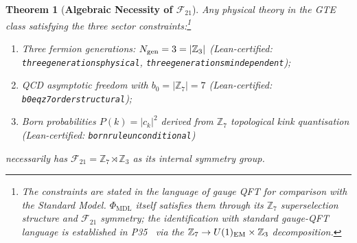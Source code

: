 \documentclass[11pt]{article}
\newtheorem{theorem}{Theorem}[section]
\theoremstyle{remark}
\newcommand{\PHIMDL}{\Phi_{\mathrm{MDL}}}
\newcommand{\ZS}{\mathbb{Z}_7}
\newcommand{\ZZ}{\mathbb{Z}}
\newcommand{\lean}[1]{%
  \penalty-100
  \begingroup\def\_{\textunderscore\allowbreak}\texttt{#1}\endgroup}
\newcommand{\FTT}{\mathcal{F}_{21}}
\begin{document}
\begin{theorem}[\textbf{Algebraic Necessity of $\FTT$}]
\label{thm:algec_necessity}
Any physical theory in the GTE class satisfying the three sector
constraints:\footnote{The constraints are stated in the language of gauge QFT for
  comparison with the Standard Model.  $\PHIMDL$ itself satisfies them through its
  $\ZS$ superselection structure and $\FTT$ symmetry; the identification with
  standard gauge-QFT language is established in P35~\cite{SpivackGTEUnification}
  via the $\ZS\to U(1)_{\rm EM}\times\ZZ_3$ decomposition.}
\begin{enumerate}[noitemsep]
  \item Three fermion generations: $N_{\rm gen} = 3 = |\ZZ_3|$
        (Lean-certified: \lean{three\_generations\_physical}, \lean{three\_generations\_m\_independent});
  \item QCD asymptotic freedom with $b_0 = |\ZS| = 7$
        (Lean-certified: \lean{b0\_eq\_z7\_order\_structural});
  \item Born probabilities $P(k) = |c_k|^2$ derived from $\ZS$ topological kink
        quantisation (Lean-certified: \lean{born\_rule\_unconditional})
\end{enumerate}
necessarily has $\FTT = \ZS \rtimes \ZZ_3$ as its internal symmetry group.
\end{theorem}


\end{document}
